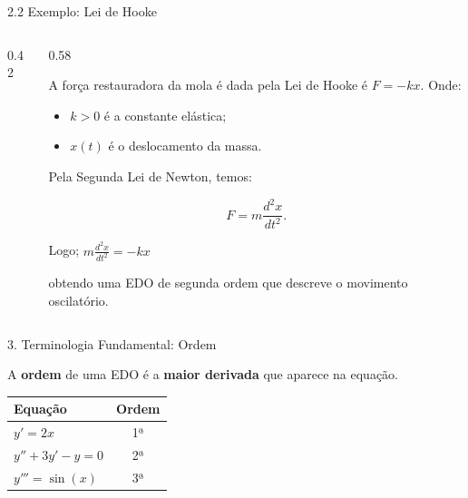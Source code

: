 \documentclass[11pt, aspectratio=169, xcolor=table]{beamer}
\begin{document}
\begin{frame}{2.2 Exemplo: Lei de Hooke}
\begin{columns}[T]

\begin{column}{0.42\textwidth}
\end{column}

\begin{column}{0.58\textwidth}

A força restauradora da mola é dada pela Lei de Hooke é $F=-kx$. Onde:

\begin{itemize}
    \item $k>0$ é a constante elástica;
    \item $x(t)$ é o deslocamento da massa.
\end{itemize}

Pela Segunda Lei de Newton, temos:

\[
F=m\frac{d^{2}x}{dt^{2}}.
\]

Logo; $m\frac{d^{2}x}{dt^{2}}=-kx$

obtendo uma EDO de segunda ordem que descreve o movimento oscilatório.

\end{column}

\end{columns}
\end{frame}

\begin{frame}{3. Terminologia Fundamental: Ordem}

\vspace{0.2cm}
A \textbf{ordem} de uma EDO é a \textbf{maior derivada} que aparece na equação.

\vspace{0.3cm}
\begin{center}
\large
\begin{tabular}{lc}
\textcolor{accent}{\textbf{Equação}} & \textcolor{accent}{\textbf{Ordem}} \\
\hline
$y' = 2x$ & 1ª \\
$y'' + 3y' - y = 0$ & 2ª \\
$y''' = \sin(x)$ & 3ª \\
\end{tabular}
\end{center}
\end{frame}
\end{document}
